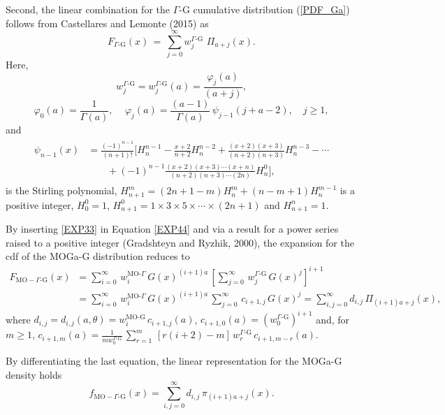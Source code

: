 \documentclass[twoside,leqno,11pt]{article}
\begin{document}
Second, the linear combination for the $\Gamma\text{-G}$ cumulative distribution (\ref{PDF_Ga}) follows from Castellares and 
Lemonte (2015) as
\begin{equation}\label{EXP33}
F_{\Gamma\text{-G}}(x)\,=\,\sum_{j=0}^\infty w_{j}^{\Gamma\text{-G}}\,\,\Pi_{a+j}(x).
\end{equation}
Here,
$$w_j^{\Gamma\text{-G}}=w_j^{\Gamma\text{-G}}(a)=\frac{\varphi_{j}(a)}{(a+j)},$$
\begin{equation*}\label{coeficientes}
\varphi_0(a)=\frac{1}{\Gamma(a)},
\quad\,
\varphi_j(a)=\frac{(a-1)}{\Gamma(a)}\,\psi_{j-1}(j+a-2),\quad j\geq 1,
\end{equation*}
and
\begin{align*}\label{polinomios_ward}
\begin{split}
\psi_{n-1}(x)&=\frac{(-1)^{n-1}}{(n+1)!}\Biggl[H^{n-1}_{n}-\frac{x+2}{n+2}H^{n-2}_{n}
+ \frac{(x+2)(x+3)}{(n+2)(n+3)}H^{n-3}_{n}- \cdots\\
&\qquad+ (-1)^{n-1}\frac{(x+2)(x+3)\cdots(x+n)}{(n+2)(n+3)\cdots(2n)}H^{0}_{n}\Biggr],
\end{split}
\end{align*}
is the Stirling polynomial, $H^{m}_{n+1}=(2n+1-m)H^{m}_{n} + (n-m+1)H^{m-1}_{n}$ is a positive integer,
$H^0_0=1$, $H^{0}_{n+1}=1\times 3\times 5\times\cdots\times(2n+1)$ and $H^{n}_{n+1}=1$.

By inserting \eqref{EXP33} in Equation \eqref{EXP44} and via a result for a power series raised to a positive integer (Gradshteyn and
Ryzhik, 2000), the expansion for the cdf of the MOGa-G distribution reduces to
\begin{align*}
F_{\text{MO}-\Gamma\text{-G}}(x)&=\sum_{i=0}^{\infty}\,w_{i}^{\text{MO-}\Gamma}\,G(x)^{(i+1)a}\,\left[\sum_{j=0}^{\infty}\,w_{j}^{\Gamma\text{-G}}\,G(x)^{j}\right]^{i+1}\\
&=\sum_{i=0}^{\infty}\,w_{i}^{\text{MO-}\Gamma}\,G(x)^{(i+1)a}\,\sum_{j=0}^{\infty}\,c_{i+1,j}\,G(x)^{j} =\sum_{i,j=0}^\infty d_{i,j}\,\Pi_{(i+1)a+j}(x),
\end{align*}
where $d_{i,j}=d_{i,j}(a,\theta)=w_{i}^{\text{MO-G}}\,c_{i+1,j}(a)$, $c_{i+1,0}(a)=(w_{0}^{\Gamma\text{-G}})^{i+1}$ and, for $m \ge 1$,
$c_{i+1,m}(a)=\frac{1}{m w_{0}^{\Gamma\text{-G}}}\,\sum^{m}_{r=1}\,\left[r(i+2)-m\right]\,w_{r}^{\Gamma\text{-G}}\,c_{i+1,m-r}(a)$.

By differentiating the last equation, the linear representation 
for the MOGa-G density holds
\begin{equation}\label{lcom}
f_{\text{MO}-\Gamma\text{-G}}(x)=\sum_{i,j=0}^\infty d_{i,j}\,\pi_{(i+1)a+j}(x).
\end{equation}
\end{document}
